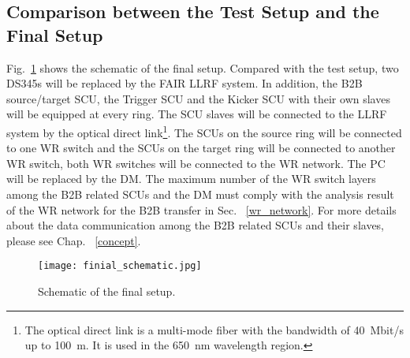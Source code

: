 \subsection{Comparison between the Test Setup and the Final Setup}
\label{sec:test_diff}
Fig.~\ref{finial_schematic} shows the schematic of the final setup. Compared with the test setup, two DS345s will be replaced by the FAIR LLRF system. In addition, the B2B source/target SCU, the Trigger SCU and the Kicker SCU with their own slaves will be equipped at every ring. The SCU slaves will be connected to the LLRF system by the optical direct link\footnote{The optical direct link is a multi-mode fiber with the bandwidth of \SI{40}{Mbit/s} up to \SI{100}{m}. It is used in the \SI{650}{nm} wavelength region.}. The SCUs on the source ring will be connected to one WR switch and the SCUs on the target ring will be connected to another WR switch, both WR switches will be connected to the WR network. The PC will be replaced by the DM. The maximum number of the WR switch layers among the B2B related SCUs and the DM must comply with the analysis result of the WR network for the B2B transfer in Sec. ~\ref{wr_network}. For more details about the data communication among the B2B related SCUs and their slaves, please see Chap. ~\ref{concept}.   

\begin{figure}[!htb]
   \centering   
   \texttt{[image: finial\_schematic.jpg]}
   \caption{Schematic of the final setup.}

   \label{finial_schematic}
\end{figure} 

